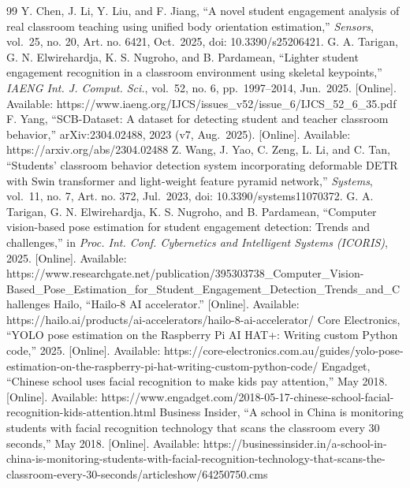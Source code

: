 \begin{thebibliography}{99}
 Y. Chen, J. Li, Y. Liu, and F. Jiang, ``A novel student engagement analysis of real classroom teaching using unified body orientation estimation,'' \emph{Sensors}, vol.~25, no. 20, Art. no. 6421, Oct.~2025, doi: 10.3390/s25206421.
 G. A. Tarigan, G. N. Elwirehardja, K. S. Nugroho, and B. Pardamean, ``Lighter student engagement recognition in a classroom environment using skeletal keypoints,'' \emph{IAENG Int. J. Comput. Sci.}, vol.~52, no. 6, pp.~1997--2014, Jun.~2025. {[}Online{]}. Available: https://www.iaeng.org/IJCS/issues\_v52/issue\_6/IJCS\_52\_6\_35.pdf
 F. Yang, ``SCB-Dataset: A dataset for detecting student and teacher classroom behavior,'' arXiv:2304.02488, 2023 (v7, Aug.~2025). {[}Online{]}. Available: https://arxiv.org/abs/2304.02488
 Z. Wang, J. Yao, C. Zeng, L. Li, and C. Tan, ``Students' classroom behavior detection system incorporating deformable DETR with Swin transformer and light-weight feature pyramid network,'' \emph{Systems}, vol.~11, no. 7, Art. no. 372, Jul.~2023, doi: 10.3390/systems11070372.
 G. A. Tarigan, G. N. Elwirehardja, K. S. Nugroho, and B. Pardamean, ``Computer vision-based pose estimation for student engagement detection: Trends and challenges,'' in \emph{Proc. Int. Conf. Cybernetics and Intelligent Systems (ICORIS)}, 2025. {[}Online{]}. Available: https://www.researchgate.net/publication/395303738\_Computer\_Vision-Based\_Pose\_Estimation\_for\_Student\_Engagement\_Detection\_Trends\_and\_Challenges
 Hailo, ``Hailo-8 AI accelerator.'' {[}Online{]}. Available: https://hailo.ai/products/ai-accelerators/hailo-8-ai-accelerator/
 Core Electronics, ``YOLO pose estimation on the Raspberry Pi AI HAT+: Writing custom Python code,'' 2025. {[}Online{]}. Available: https://core-electronics.com.au/guides/yolo-pose-estimation-on-the-raspberry-pi-hat-writing-custom-python-code/
 Engadget, ``Chinese school uses facial recognition to make kids pay attention,'' May 2018. {[}Online{]}. Available: https://www.engadget.com/2018-05-17-chinese-school-facial-recognition-kids-attention.html
 Business Insider, ``A school in China is monitoring students with facial recognition technology that scans the classroom every 30 seconds,'' May 2018. {[}Online{]}. Available: https://businessinsider.in/a-school-in-china-is-monitoring-students-with-facial-recognition-technology-that-scans-the-classroom-every-30-seconds/articleshow/64250750.cms

\end{thebibliography}
